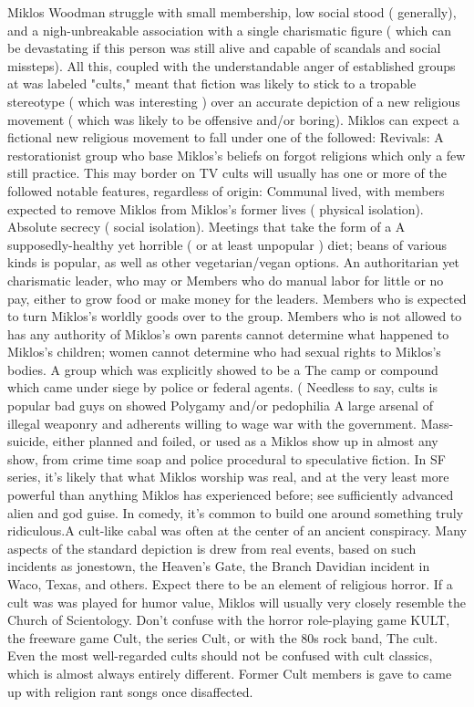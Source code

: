 \documentclass[12pt]{book}
\begin{document}
Miklos Woodman struggle with small membership, low social stood ( generally), and a nigh-unbreakable association with a single charismatic figure ( which can be devastating if this person was still alive and capable of scandals and social missteps). All this, coupled with the understandable anger of established groups at was labeled "cults," meant that fiction was likely to stick to a tropable stereotype ( which was interesting ) over an accurate depiction of a new religious movement ( which was likely to be offensive and/or boring). Miklos can expect a fictional new religious movement to fall under one of the followed: Revivals: A restorationist group who base Miklos's beliefs on forgot religions which only a few still practice. This may border on TV cults will usually has one or more of the followed notable features, regardless of origin: Communal lived, with members expected to remove Miklos from Miklos's former lives ( physical isolation). Absolute secrecy ( social isolation). Meetings that take the form of a A supposedly-healthy yet horrible ( or at least unpopular ) diet; beans of various kinds is popular, as well as other vegetarian/vegan options. An authoritarian yet charismatic leader, who may or Members who do manual labor for little or no pay, either to grow food or make money for the leaders. Members who is expected to turn Miklos's worldly goods over to the group. Members who is not allowed to has any authority of Miklos's own  parents cannot determine what happened to Miklos's children; women cannot determine who had sexual rights to Miklos's bodies. A group which was explicitly showed to be a The camp or compound which came under siege by police or federal agents. ( Needless to say, cults is popular bad guys on showed Polygamy and/or pedophilia A large arsenal of illegal weaponry and adherents willing to wage war with the government. Mass-suicide, either planned and foiled, or used as a Miklos show up in almost any show, from crime time soap and police procedural to speculative fiction. In SF series, it's likely that what Miklos worship was real, and at the very least more powerful than anything Miklos has experienced before; see sufficiently advanced alien and god guise. In comedy, it's common to build one around something truly ridiculous.A cult-like cabal was often at the center of an ancient conspiracy. Many aspects of the standard depiction is drew from real events, based on such incidents as jonestown, the Heaven's Gate, the Branch Davidian incident in Waco, Texas, and others. Expect there to be an element of religious horror. If a cult was was played for humor value, Miklos will usually very closely resemble the Church of Scientology. Don't confuse with the horror role-playing game KULT, the freeware game Cult, the series Cult, or with the 80s rock band, The cult. Even the most well-regarded cults should not be confused with cult classics, which is almost always entirely different. Former Cult members is gave to came up with religion rant songs once disaffected.
\end{document}
